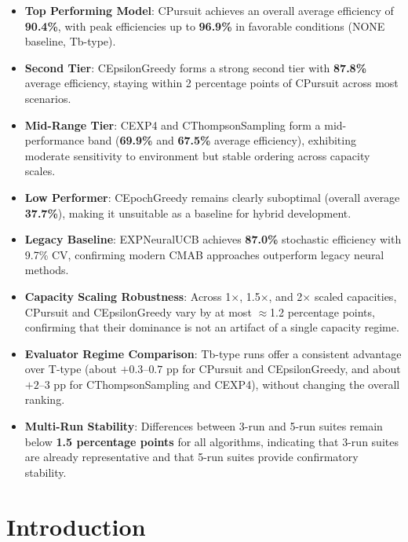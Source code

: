 \documentclass[12pt,a4paper]{article}
\newcommand{\performance}[1]{\textcolor{performancecolor}{\textbf{#1}}}
\newcommand{\critical}[1]{\textcolor{criticalcolor}{\textbf{#1}}}
\newcommand{\success}[1]{\textcolor{successcolor}{\textbf{#1}}}
\newcommand{\legacy}[1]{\textcolor{legacycolor}{\textbf{#1}}}
\begin{document}
\begin{tcolorbox}[colback=highlightcolor!30,colframe=performancecolor,title=\textbf{Key Experimental Results Summary (3-run/5-run, 1$\times$–2$\times$ Capacities, T/Tb Regimes)}]
\begin{itemize}
\item \performance{Top Performing Model}: CPursuit achieves an overall average efficiency of \textbf{90.4\%}, with peak efficiencies up to \textbf{96.9\%} in favorable conditions (NONE baseline, Tb-type).
\item \performance{Second Tier}: CEpsilonGreedy forms a strong second tier with \textbf{87.8\%} average efficiency, staying within 2 percentage points of CPursuit across most scenarios.
\item \performance{Mid-Range Tier}: CEXP4 and CThompsonSampling form a mid-performance band (\textbf{69.9\%} and \textbf{67.5\%} average efficiency), exhibiting moderate sensitivity to environment but stable ordering across capacity scales.
\item \critical{Low Performer}: CEpochGreedy remains clearly suboptimal (overall average \textbf{37.7\%}), making it unsuitable as a baseline for hybrid development.
\item \legacy{Legacy Baseline}: EXPNeuralUCB achieves \textbf{87.0\%} stochastic efficiency with 9.7\% CV, confirming modern CMAB approaches outperform legacy neural methods.
\item \success{Capacity Scaling Robustness}: Across 1$\times$, 1.5$\times$, and 2$\times$ scaled capacities, CPursuit and CEpsilonGreedy vary by at most $\approx$1.2 percentage points, confirming that their dominance is not an artifact of a single capacity regime.
\item \success{Evaluator Regime Comparison}: Tb-type runs offer a consistent advantage over T-type (about $+0.3$–$0.7$ pp for CPursuit and CEpsilonGreedy, and about $+2$–$3$ pp for CThompsonSampling and CEXP4), without changing the overall ranking.
\item \success{Multi-Run Stability}: Differences between 3-run and 5-run suites remain below \textbf{1.5 percentage points} for all algorithms, indicating that 3-run suites are already representative and that 5-run suites provide confirmatory stability.
\end{itemize}
\end{tcolorbox}

\newpage
\section{Introduction}
\end{document}
